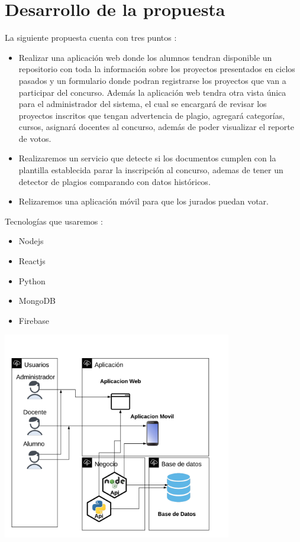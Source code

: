 \documentclass[%
 reprint,
 amsmath,amssymb,
 aps,
]{revtex4-1}
\begin{document}
\section {Desarrollo de la propuesta}
La siguiente propuesta cuenta con tres puntos :
\begin{itemize}
\item Realizar una aplicación web donde los alumnos tendran disponible un repositorio con toda la información sobre los proyectos presentados en ciclos pasados y un formulario donde podran registrarse los proyectos que van a participar del concurso. Además la aplicación web tendra otra vista única para el administrador del sistema, el cual se encargará de revisar los proyectos inscritos que tengan advertencia de plagio, agregará categorías, cursos, asignará docentes al concurso, además de poder visualizar el reporte de votos.  
\item Realizaremos un servicio que detecte si los documentos cumplen con la plantilla establecida parar la inscripción al concurso, ademas de tener un detector de plagios comparando con datos históricos.
\item Relizaremos una aplicación móvil para que los jurados puedan votar.
\end{itemize}
\newpage
Tecnologías que usaremos :
\begin{itemize}
\item Nodejs
\item Reactjs
\item Python
\item MongoDB
\item Firebase
\end{itemize}
\begin{center}
\includegraphics[width=10cm]{./Imagenes/arquitectura2}
\end{center}
\end{document}
